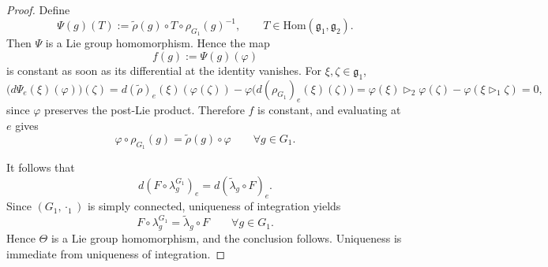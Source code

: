 \documentclass[10pt,a4paper]{amsart}
\begin{document}
\begin{proof}
Define
\[
\Psi(g)(T):=\widetilde{\rho}(g)\circ T\circ \rho_{G_1}(g)^{-1},
\qquad
T\in \mathrm{Hom}(\mathfrak g_1,\mathfrak g_2).
\]
Then $\Psi$ is a Lie group homomorphism. Hence the map
\[
f(g):=\Psi(g)(\varphi)
\]
is constant as soon as its differential at the identity vanishes. For $\xi,\zeta\in \mathfrak g_1$,
\[
\bigl(d\Psi_e(\xi)(\varphi)\bigr)(\zeta)
=
d(\widetilde{\rho})_e(\xi)(\varphi(\zeta))
-
\varphi\bigl(d(\rho_{G_1})_e(\xi)(\zeta)\bigr)
=
\varphi(\xi)\triangleright_2 \varphi(\zeta)-\varphi(\xi\triangleright_1 \zeta)=0,
\]
since $\varphi$ preserves the post-Lie product. Therefore $f$ is constant, and evaluating at $e$
gives
\[
\varphi\circ \rho_{G_1}(g)=\widetilde{\rho}(g)\circ \varphi
\qquad\forall g\in G_1.
\]

It follows that
\[
d(F\circ \lambda^{G_1}_g)_e=d(\widetilde{\lambda}_g\circ F)_e.
\]
Since $(G_1,\cdot_1)$ is simply connected, uniqueness of integration yields
\[
F\circ \lambda^{G_1}_g=\widetilde{\lambda}_g\circ F
\qquad\forall g\in G_1.
\]
Hence $\Theta$ is a Lie group homomorphism, and the conclusion follows.
Uniqueness is immediate from uniqueness of integration.
\end{proof}
\end{document}
